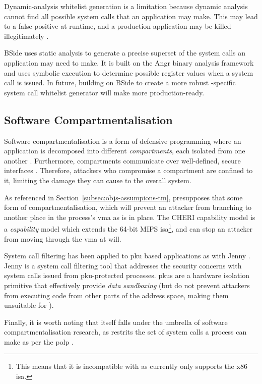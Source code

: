 Dynamic-analysis whitelist generation is a limitation because dynamic analysis
cannot find all possible system calls that an application may
make. This may lead to a false positive at runtime, and a production application
may be killed illegitimately \cite{XING2022105}. 

BSide \cite{BSIDE} uses static analysis to generate a precise
superset of the system calls an application may need to make. It is built on 
the Angr \cite{angr2025} binary analysis framework and uses symbolic execution
to determine possible register values when a system call is issued. In future,
building on BSide to create a more robust \af-specific system call whitelist
generator will make \af more production-ready.

\subsection{Software Compartmentalisation}

Software compartmentalisation is a form of defensive programming where an
application is decomposed into different \textit{compartments}, each isolated
from one another \cite{SOK}. Furthermore, compartments communicate over
well-defined, secure interfaces \cite{CONFFUZZ}. Therefore, attackers who
compromise a compartment are confined to it, limiting the damage they can
cause to the overall system.

As referenced in Section~\ref{subsec:objs-assumpions-tm}, \af presupposes that some
form of compartmentalisation, which will prevent an attacker from branching to
another place in the process's \ac{vma} as is in place. The CHERI capability
model \cite{CHERI} is a \textit{capability} model which extends the 64-bit MIPS
\ac{isa}\footnote{This means that it is incompatible with \af as \af
currently only supports the x86 \ac{isa}.}, and can stop an attacker from moving through the
\ac{vma} at will. 

System call filtering has been applied to \ac{pku} based applications as with
Jenny \cite{JENNY}. Jenny is a system call filtering tool that addresses
the security concerns with system calls issued from
\ac{pku}-protected processes. \acp{pku} are a hardware isolation primitive that
effectively provide \textit{data sandboxing} (but do not prevent attackers
from executing code from other parts of the address space, making them unsuitable for
\af).

Finally, it is worth noting that \af itself falls under the umbrella of software
compartmentalisation research, as \af restrits the set of system calls a process
can make as per the \ac{polp} \cite{SALTZER_SCHROEDER}.

